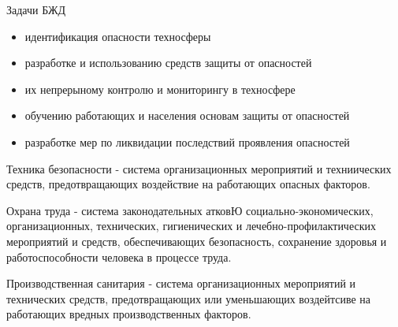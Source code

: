 \documentclass{article}
\begin{document}
Задачи БЖД

\begin{itemize}
    \item идентификация опасности техносферы
    \item разработке и использованию средств защиты от опасностей
    \item их непрерыному контролю и мониторингу в техносфере
    \item обучению работающих и населения основам защиты от опасностей
    \item разработке мер по ликвидации последствий проявления опасностей
\end{itemize}

Техника безопасности - система организационных мероприятий и техниических средств, предотвращающих воздействие на работающих опасных факторов.

Охрана труда - система законодательных атковЮ социально-экономических, организационных, технических, гигиенических и лечебно-профилактических мероприятий и средств, обеспечивающих безопасность, сохранение здоровья и работоспособности человека в процессе труда.

Производственная санитария - система организационных мероприятий и технических средств, предотвращающих или уменьшающих воздейтсиве на работающих вредных производственных факторов.
\end{document}
